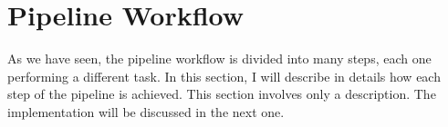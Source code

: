 \documentclass{standalone}
\begin{document}
\section{Pipeline Workflow}

As we have seen, the pipeline workflow is divided into many steps, each one performing a different task. 
In this section, I will describe in details how each step of the pipeline is achieved. 
This section involves only a description. 
The implementation will be discussed in the next one.
\end{document}
